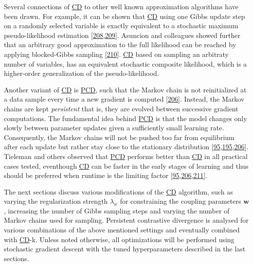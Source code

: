 \documentclass[11pt,a4paper,twoside]{book}
\newcommand{\w}{\mathbf{w}}
\theoremstyle{definition}
\theoremstyle{definition}
\theoremstyle{remark}
\begin{document}
Several connections of \protect\hyperlink{abbrev}{CD} to other well
known approximation algorithms have been drawn. For example, it can be
shown that \protect\hyperlink{abbrev}{CD} using one Gibbs update step on
a randomly selected variable is exactly equivalent to a stochastic
maximum pseudo-likelihood estimation
{[}\protect\hyperlink{ref-Hyvarinen2006}{208},\protect\hyperlink{ref-Hyvarinen2007}{209}{]}.
Asuncion and colleagues showed further that an arbitrary good
approximation to the full likelihood can be reached by applying
blocked-Gibbs sampling {[}\protect\hyperlink{ref-Asuncion2010}{210}{]}.
\protect\hyperlink{abbrev}{CD} based on sampling an arbitraty number of
variables, has an equivalent stochastic composite likelihood, which is a
higher-order generalization of the pseudo-likelihood.

Another variant of \protect\hyperlink{abbrev}{CD} is
\protect\hyperlink{abbrev}{PCD}, such that the Markov chain is not
reinitialized at a data sample every time a new gradient is computed
{[}\protect\hyperlink{ref-Tieleman2008}{206}{]}. Instead, the Markov
chains are kept \emph{persistent} that is, they are evolved between
successive gradient computations. The fundamental idea behind
\protect\hyperlink{abbrev}{PCD} is that the model changes only slowly
between parameter updates given a sufficiently small learning rate.
Consequently, the Markov chains will not be pushed too far from
equilibrium after each update but rather stay close to the stationary
distribution
{[}\protect\hyperlink{ref-Murphy2012}{95},\protect\hyperlink{ref-Fischer2012}{195},\protect\hyperlink{ref-Tieleman2008}{206}{]}.
Tieleman and others observed that \protect\hyperlink{abbrev}{PCD}
performs better than \protect\hyperlink{abbrev}{CD} in all practical
cases tested, eventhough \protect\hyperlink{abbrev}{CD} can be faster in
the early stages of learning and thus should be preferred when runtime
is the limiting factor
{[}\protect\hyperlink{ref-Murphy2012}{95},\protect\hyperlink{ref-Tieleman2008}{206},\protect\hyperlink{ref-Swersky2010}{211}{]}.

The next sections discuss various modifications of the
\protect\hyperlink{abbrev}{CD} algorithm, such as varying the
regularization strength \(\lambda_w\) for constraining the coupling
parameters \(\w\), increasing the number of Gibbs sampling steps and
varying the number of Markov chains used for sampling. Persistent
contrastive divergence is analysed for various combinations of the above
mentioned settings and eventually combined with
\protect\hyperlink{abbrev}{CD}-k. Unless noted otherwise, all
optimizations will be performed using stochastic gradient descent with
the tuned hyperparameters described in the last sections.
\end{document}
